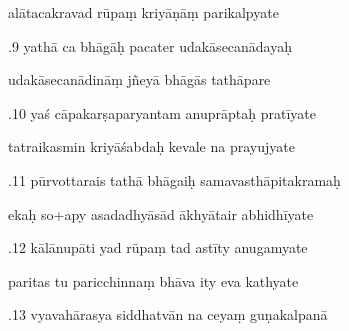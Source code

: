 \documentclass[article,12pt,a4paper]{memoir}%
\newcounter{parCount}
\begin{document}
	  
	  \pstart \leavevmode%
	alātacakravad rūpaṃ kriyāṇāṃ parikalpyate 
	{}
	\pend%
      

	  
	  \pstart {}.9 yathā ca bhāgāḥ pacater udakāsecanādayaḥ 
	{}
	\pend%
      

	  
	  \pstart \leavevmode%
	udakāsecanādināṃ jñeyā bhāgās tathāpare 
	{}
	\pend%
      

	  
	  \pstart {}.10 yaś cāpakarṣaparyantam anuprāptaḥ pratīyate 
	{}
	\pend%
      

	  
	  \pstart \leavevmode%
	tatraikasmin kriyāśabdaḥ kevale na prayujyate 
	{}
	\pend%
      

	  
	  \pstart {}.11 pūrvottarais tathā bhāgaiḥ   samavasthāpitakramaḥ 
	{}
	\pend%
      

	  
	  \pstart \leavevmode%
	ekaḥ so+apy asadadhyāsād ākhyātair abhidhīyate 
	{}
	\pend%
      

	  
	  \pstart {}.12 kālānupāti yad rūpaṃ tad astīty anugamyate 
	{}
	\pend%
      

	  
	  \pstart \leavevmode%
	paritas tu paricchinnaṃ bhāva ity eva kathyate 
	{}
	\pend%
      

	  
	  \pstart {}.13 vyavahārasya siddhatvān na ceyaṃ guṇakalpanā 
	{}
	\pend%
      
\end{document}

